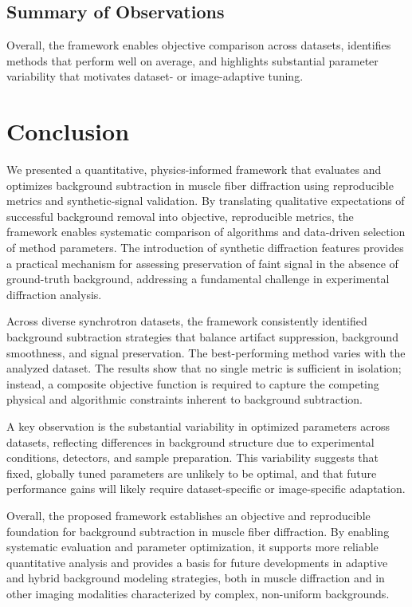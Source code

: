 \documentclass[11pt,onecolumn]{IEEEtran}
\begin{document}
\subsection{Summary of Observations}


Overall, the framework enables objective comparison across datasets, identifies methods that perform well on average, and highlights substantial parameter variability that motivates dataset- or image-adaptive tuning.




\section{Conclusion} 


We presented a quantitative, physics-informed framework that evaluates and optimizes background subtraction in muscle fiber diffraction using reproducible metrics and synthetic-signal validation. By translating qualitative expectations of successful background removal into objective, reproducible metrics, the framework enables systematic comparison of algorithms and data-driven selection of method parameters. The introduction of synthetic diffraction features provides a practical mechanism for assessing preservation of faint signal in the absence of ground-truth background, addressing a fundamental challenge in experimental diffraction analysis.

Across diverse synchrotron datasets, the framework consistently identified background subtraction strategies that balance artifact suppression, background smoothness, and signal preservation. The best-performing method varies with the analyzed dataset. The results show that no single metric is sufficient in isolation; instead, a composite objective function is required to capture the competing physical and algorithmic constraints inherent to background subtraction. 

A key observation is the substantial variability in optimized parameters across datasets, reflecting differences in background structure due to experimental conditions, detectors, and sample preparation. This variability suggests that fixed, globally tuned parameters are unlikely to be optimal, and that future performance gains will likely require dataset-specific or image-specific adaptation.

Overall, the proposed framework establishes an objective and reproducible foundation for background subtraction in muscle fiber diffraction. By enabling systematic evaluation and parameter optimization, it supports more reliable quantitative analysis and provides a basis for future developments in adaptive and hybrid background modeling strategies, both in muscle diffraction and in other imaging modalities characterized by complex, non-uniform backgrounds.
\end{document}
